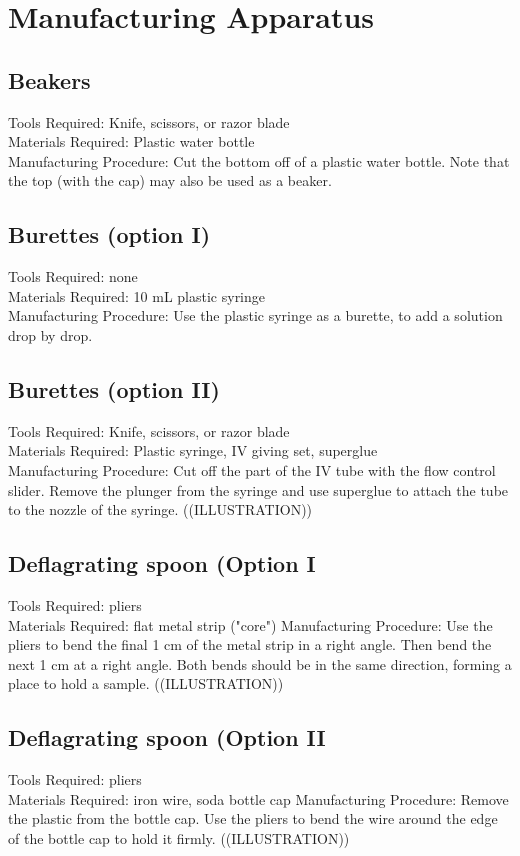 \section{Manufacturing Apparatus}

\subsection*{Beakers}
Tools Required: Knife, scissors, or razor blade\\
Materials Required: Plastic water bottle\\
Manufacturing Procedure: Cut the bottom off of a plastic water bottle. Note that the top (with the cap) may also be used as a beaker.

\subsection*{Burettes (option I)}
Tools Required: none\\
Materials Required: 10 mL plastic syringe\\
Manufacturing Procedure: Use the plastic syringe as a burette, to add a solution drop by drop.

\subsection*{Burettes (option II)}
Tools Required: Knife, scissors, or razor blade\\
Materials Required: Plastic syringe, IV giving set, superglue\\
Manufacturing Procedure: Cut off the part of the IV tube with the flow control slider. Remove the plunger from the syringe and use superglue to attach the tube to the nozzle of the syringe. ((ILLUSTRATION))

\subsection*{Deflagrating spoon (Option I}
Tools Required: pliers\\
Materials Required: flat metal strip ("core")
Manufacturing Procedure: Use the pliers to bend the final 1 cm of the metal strip in a right angle. Then bend the next 1 cm at a right angle. Both bends should be in the same direction, forming a place to hold a sample. ((ILLUSTRATION))

\subsection*{Deflagrating spoon (Option II}
Tools Required: pliers\\
Materials Required: iron wire, soda bottle cap
Manufacturing Procedure: Remove the plastic from the bottle cap. Use the pliers to bend the wire around the edge of the bottle cap to hold it firmly. ((ILLUSTRATION))

